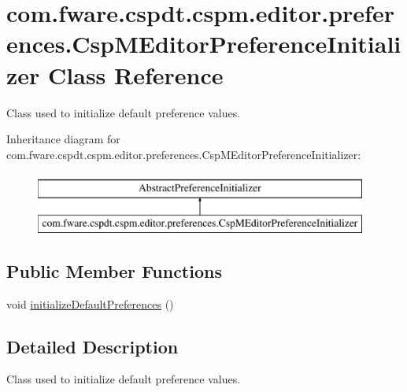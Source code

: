 \hypertarget{classcom_1_1fware_1_1cspdt_1_1cspm_1_1editor_1_1preferences_1_1_csp_m_editor_preference_initializer}{}\section{com.\+fware.\+cspdt.\+cspm.\+editor.\+preferences.\+Csp\+M\+Editor\+Preference\+Initializer Class Reference}
\label{classcom_1_1fware_1_1cspdt_1_1cspm_1_1editor_1_1preferences_1_1_csp_m_editor_preference_initializer}


Class used to initialize default preference values.  


Inheritance diagram for com.\+fware.\+cspdt.\+cspm.\+editor.\+preferences.\+Csp\+M\+Editor\+Preference\+Initializer\+:\begin{figure}[H]
\begin{center}
\leavevmode
\includegraphics[height=2.000000cm]{classcom_1_1fware_1_1cspdt_1_1cspm_1_1editor_1_1preferences_1_1_csp_m_editor_preference_initializer}
\end{center}
\end{figure}
\subsection*{Public Member Functions}
\begin{DoxyCompactItemize}
\item 
void \hyperlink{classcom_1_1fware_1_1cspdt_1_1cspm_1_1editor_1_1preferences_1_1_csp_m_editor_preference_initializer_a0809ddbc5a8679661226f3e1d0988995}{initialize\+Default\+Preferences} ()
\end{DoxyCompactItemize}


\subsection{Detailed Description}
Class used to initialize default preference values. 

